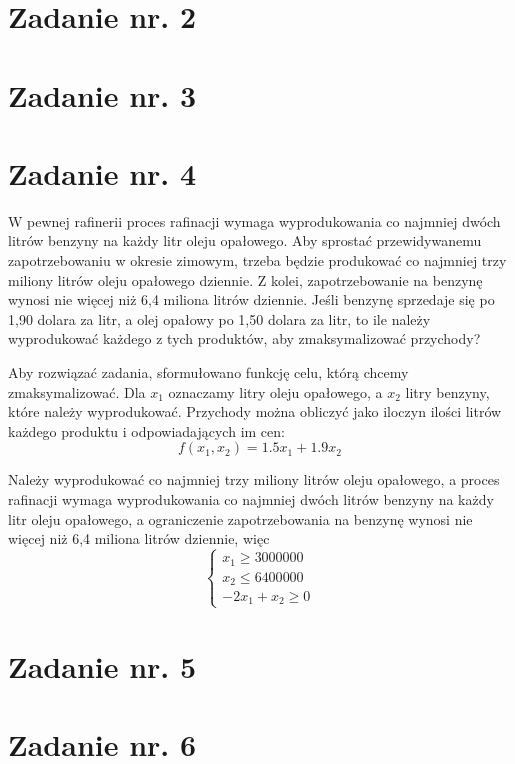 \documentclass{article}
\begin{document}
\section{Zadanie nr. 2}

\section{Zadanie nr. 3}

\section{Zadanie nr. 4}
W pewnej rafinerii proces rafinacji wymaga wyprodukowania co najmniej dwóch
litrów benzyny na każdy litr oleju opałowego. Aby sprostać przewidywanemu zapotrzebowaniu
w okresie zimowym, trzeba będzie produkować co najmniej trzy miliony litrów oleju
opałowego dziennie. Z kolei, zapotrzebowanie na benzynę wynosi nie więcej niż 6,4 miliona
litrów dziennie. Jeśli benzynę sprzedaje się po 1,90 dolara za litr, a olej opałowy po 1,50 dolara
za litr, to ile należy wyprodukować każdego z tych produktów, aby zmaksymalizować
przychody?
\newline

Aby rozwiązać zadania, sformułowano funkcję celu, którą chcemy zmaksymalizować. Dla $x_1$ oznaczamy litry oleju opałowego, 
a $x_2$ litry benzyny, które należy wyprodukować. Przychody można obliczyć jako iloczyn ilości litrów każdego produktu i odpowiadających im cen:
\begin{equation}
   f(x_1,x_2)=1.5x_1 + 1.9x_2 
\end{equation}

Należy wyprodukować co najmniej trzy miliony litrów oleju opałowego, a proces rafinacji wymaga wyprodukowania co najmniej dwóch litrów
benzyny na każdy litr oleju opałowego, a ograniczenie zapotrzebowania na benzynę wynosi nie więcej niż 6,4 miliona litrów dziennie, więc
\begin{equation}
    \begin{cases}
        x_1 \geq 3000000\\
        x_2 \leq 6 400 000\\
        -2x_1 + x_2 \geq 0
    \end{cases}
\end{equation}
\section{Zadanie nr. 5}

\section{Zadanie nr. 6}
\end{document}
